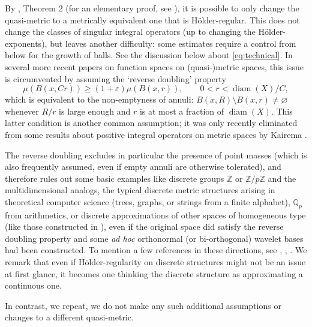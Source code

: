 \documentclass{amsart}
\numberwithin{equation}{section}
\theoremstyle{plain}
\theoremstyle{definition}
\theoremstyle{remark}
\begin{document}
{{{ By \cite{MS}, Theorem 2 (for an elementary proof, see \cite{PS}), it is possible to  only change the quasi-metric to a metrically equivalent one that is H\"older-regular. This does not change the classes of singular integral operators (up to changing the H\"older-exponents), but  leaves another difficulty:  some estimates require a control from below for the growth of balls.  See the discussion below about \eqref{eq:technical}. 
In several more recent papers \cite{HMY2,HMY1,YZ2,YZ1} on function spaces on (quasi-)metric spaces, this issue is circumvented by assuming}
 the  `reverse doubling' property
\begin{equation*}
  \mu(B(x,Cr))\geq(1+\varepsilon)\mu(B(x,r)),\qquad 0<r<{\operatorname{diam}}(X)/C,
\end{equation*}
which is equivalent to the non-emptyness of annuli: $B(x,R)\setminus B(x,r)\neq\varnothing$ whenever $R/r$ is large enough and $r$ is at most a fraction of ${\operatorname{diam}}(X)$. This latter condition is another common assumption;  it was only recently eliminated from some results about positive integral operators on metric spaces by Kairema \cite{Kairema}.

The reverse doubling excludes in particular the presence of point masses (which is also frequently assumed, even if empty annuli are otherwise tolerated), and therefore rules out some basic examples like discrete groups  ${\mathbb{Z}}$ or ${\mathbb{Z}}/p{\mathbb{Z}}$ and the multidimensional analogs, the typical discrete metric structures arising in theoretical computer science (trees, graphs, or strings from a finite alphabet), ${\mathbb{Q}}_{p}$ from arithmetics, or discrete approximations of other spaces of homogeneous type (like those constructed in \cite{ACI}), even if the original space did satisfy the reverse doubling property and some \textit{ad hoc} orthonormal (or bi-orthogonal) wavelet bases had been constructed. To mention a few references in these directions, see \cite{AES}, \cite{PZ}, \cite{S}. We remark that even if H\"older-regularity on discrete structures might not be an issue at first glance, it becomes one thinking the discrete structure as approximating a continuous one.

In contrast, we repeat, we do not make any such additional assumptions or changes to a different quasi-metric.

}}
\end{document}
